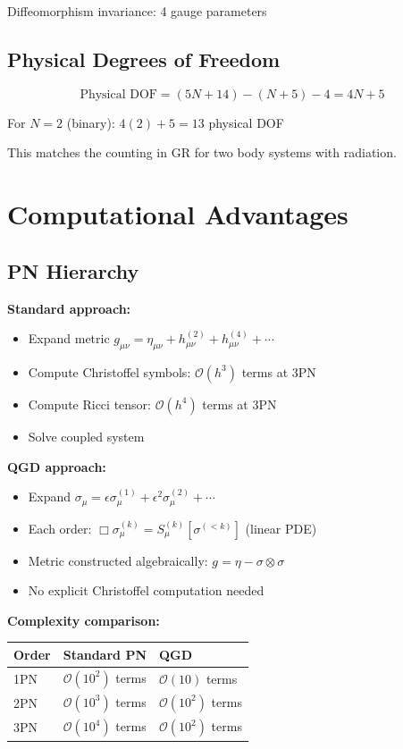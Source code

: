 \documentclass[11pt,a4paper]{article}
\theoremstyle{definition}
\theoremstyle{remark}
\begin{document}
		Diffeomorphism invariance: 4 gauge parameters
		
		\subsection{Physical Degrees of Freedom}
		
		\begin{equation}
			\text{Physical DOF} = (5N + 14) - (N + 5) - 4 = 4N + 5
		\end{equation}
		
		For $N=2$ (binary): $4(2) + 5 = 13$ physical DOF
		
		This matches the counting in GR for two body systems with radiation.
		
		\section{Computational Advantages}
		
		\subsection{PN Hierarchy}
		
		\textbf{Standard approach:}
		\begin{itemize}
			\item Expand metric $g_{\mu\nu} = \eta_{\mu\nu} + h_{\mu\nu}^{(2)} + h_{\mu\nu}^{(4)} + \cdots$
			\item Compute Christoffel symbols: $\mathcal{O}(h^3)$ terms at 3PN
			\item Compute Ricci tensor: $\mathcal{O}(h^4)$ terms at 3PN
			\item Solve coupled system
		\end{itemize}
		
		\textbf{QGD approach:}
		\begin{itemize}
			\item Expand $\sigma_\mu = \epsilon\sigma_\mu^{(1)} + \epsilon^2\sigma_\mu^{(2)} + \cdots$
			\item Each order: $\Box\sigma_\mu^{(k)} = S_\mu^{(k)}[\sigma^{(<k)}]$ (linear PDE)
			\item Metric constructed algebraically: $g = \eta - \sigma\otimes\sigma$
			\item No explicit Christoffel computation needed
		\end{itemize}
		
		\textbf{Complexity comparison:}
		
		\begin{center}
			\begin{tabular}{lll}
				\hline
				Order & Standard PN & QGD\\
				\hline
				1PN & $\mathcal{O}(10^2)$ terms & $\mathcal{O}(10)$ terms\\
				2PN & $\mathcal{O}(10^3)$ terms & $\mathcal{O}(10^2)$ terms\\
				3PN & $\mathcal{O}(10^4)$ terms & $\mathcal{O}(10^2)$ terms\\
				\hline
			\end{tabular}
		\end{center}
		
\end{document}
